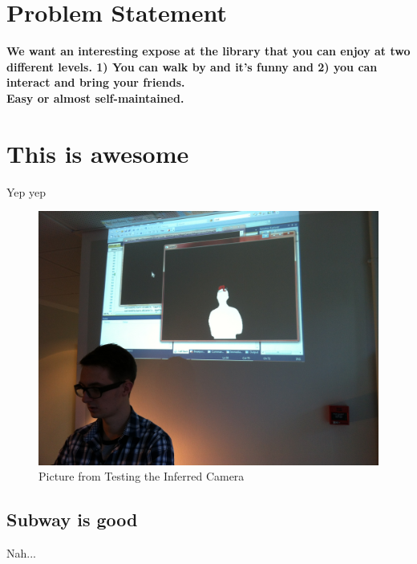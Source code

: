 \section{Problem Statement}
      
\textbf{We want an interesting expose at the library that you can enjoy at two different levels. 1) You can walk by and it's funny and 2) you can interact and bring your friends.}\\
\textbf{Easy or almost self-maintained.}

\section{This is awesome}
Yep yep

\begin{figure}[htbp]
\centering
\includegraphics[width=1.00\textwidth]{Pictures/Test/IMG_1477.jpg}
\caption{Picture from Testing the Inferred Camera}
\label{fig:Picture from Testing the Inferred Camera}
\end{figure}

\subsection{Subway is good}
Nah...